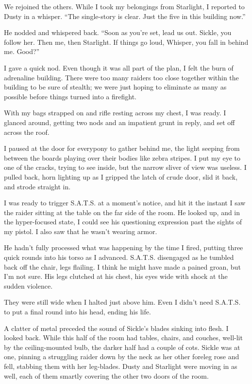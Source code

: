 We rejoined the others. While I took my belongings from Starlight, I reported to Dusty in a whisper. “The single-story is clear. Just the five in this building now.”

He nodded and whispered back. “Soon as you’re set, lead us out. Sickle, you follow her. Then me, then Starlight. If things go loud, Whisper, you fall in behind me. Good?”

I gave a quick nod. Even though it was all part of the plan, I felt the burn of adrenaline building. There were too many raiders too close together within the building to be sure of stealth; we were just hoping to eliminate as many as possible before things turned into a firefight.

With my bags strapped on and rifle resting across my chest, I was ready. I glanced around, getting two nods and an impatient grunt in reply, and set off across the roof.

I paused at the door for everypony to gather behind me, the light seeping from between the boards playing over their bodies like zebra stripes. I put my eye to one of the cracks, trying to see inside, but the narrow sliver of view was useless. I pulled back, horn lighting up as I gripped the latch of crude door, slid it back, and strode straight in.

I was ready to trigger S.A.T.S. at a moment’s notice, and hit it the instant I saw the raider sitting at the table on the far side of the room. He looked up, and in the hyper-focused state, I could see his questioning expression past the sights of my pistol. I also saw that he wasn’t wearing armor.

He hadn’t fully processed what was happening by the time I fired, putting three quick rounds into his torso as I advanced. S.A.T.S. disengaged as he tumbled back off the chair, legs flailing. I think he might have made a pained groan, but I’m not sure. His legs clutched at his chest, his eyes wide with shock at the sudden violence.

They were still wide when I halted just above him. Even I didn’t need S.A.T.S. to put a final round into his head, ending his life.

A clatter of metal preceded the sound of Sickle’s blades sinking into flesh. I looked back. While this half of the room had tables, chairs, and couches, well-lit by the ceiling-mounted bulb, the darker half had a couple of cots. Sickle was at one, pinning a struggling raider down by the neck as her other foreleg rose and fell, stabbing them with her leg-blades. Dusty and Starlight were moving in as well, each of them smartly covering the other two doors of the room.

